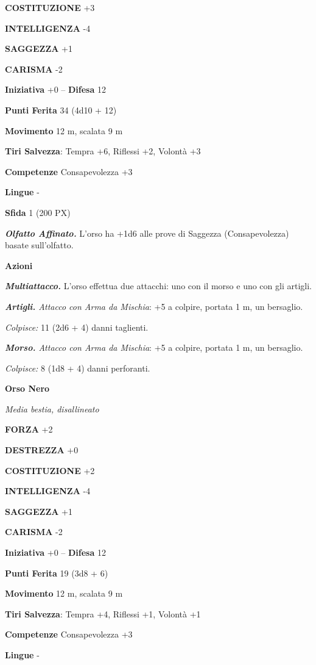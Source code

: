 \begin{multicols}{2}
\textbf{COSTITUZIONE} +3

\textbf{INTELLIGENZA} -4

\textbf{SAGGEZZA} +1

\textbf{CARISMA} -2

\textbf{Iniziativa} +0 -- \textbf{Difesa} 12

\textbf{Punti Ferita} 34 (4d10 + 12)

\textbf{Movimento} 12 m, scalata 9 m

\textbf{Tiri Salvezza}: Tempra +6, Riflessi +2, Volontà +3

\textbf{Competenze} Consapevolezza +3

\textbf{Lingue} -

\textbf{Sfida} 1 (200 PX)

\textit{\textbf{Olfatto Affinato.}} L'orso ha +1d6 alle prove di Saggezza (Consapevolezza) basate sull'olfatto.

\textbf{Azioni}

\textit{\textbf{Multiattacco.}} L'orso effettua due attacchi: uno con il morso e uno con gli artigli.

\textit{\textbf{Artigli.} Attacco con Arma da Mischia}: +5 a colpire, portata 1 m, un bersaglio.

\textit{Colpisce:} 11 (2d6 + 4) danni taglienti.

\textit{\textbf{Morso.} Attacco con Arma da Mischia}: +5 a colpire, portata 1 m, un bersaglio.

\textit{Colpisce:} 8 (1d8 + 4) danni perforanti.

\medskip\textbf{Orso Nero}

\textit{Media bestia, disallineato}

\textbf{FORZA} +2

\textbf{DESTREZZA} +0

\textbf{COSTITUZIONE} +2

\textbf{INTELLIGENZA} -4

\textbf{SAGGEZZA} +1

\textbf{CARISMA} -2

\textbf{Iniziativa} +0 -- \textbf{Difesa} 12

\textbf{Punti Ferita} 19 (3d8 + 6)

\textbf{Movimento} 12 m, scalata 9 m

\textbf{Tiri Salvezza}: Tempra +4, Riflessi +1, Volontà +1

\textbf{Competenze} Consapevolezza +3

\textbf{Lingue} -


\end{multicols}
